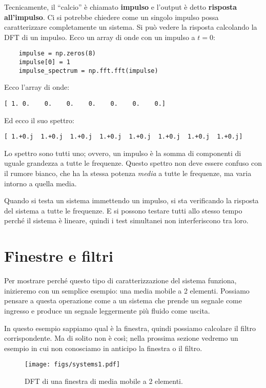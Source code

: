 \documentclass[12pt,a4paper]{book}
\begin{document}
Tecnicamente, il ``calcio'' è chiamato {\bf impulso} e l'output è detto {\bf risposta all'impulso}. Ci si potrebbe chiedere come un singolo impulso possa caratterizzare completamente un sistema. Si può vedere la risposta calcolando la DFT di un impulso. Ecco un array di onde con un impulso a $t=0$:

\begin{verbatim} 
    impulse = np.zeros(8)
    impulse[0] = 1
    impulse_spectrum = np.fft.fft(impulse)
 \end{verbatim} 

Ecco l'array di onde:

\begin{verbatim} 
[ 1. 0.    0.    0.    0.    0.    0.    0.]
 \end{verbatim} 

Ed ecco il suo spettro:

\begin{verbatim} 
[ 1.+0.j  1.+0.j  1.+0.j  1.+0.j  1.+0.j  1.+0.j  1.+0.j  1.+0.j]
 \end{verbatim} 

Lo spettro sono tutti uno; ovvero, un impulso è la somma di componenti di uguale grandezza a tutte le frequenze. Questo spettro non deve essere confuso con il rumore bianco, che ha la stessa potenza {\em media} a tutte le frequenze, ma varia intorno a quella media.

Quando si testa un sistema immettendo un impulso, si sta verificando la risposta del sistema a tutte le frequenze. E si possono testare tutti allo stesso tempo perché il sistema è lineare, quindi i test simultanei non interferiscono tra loro.

\section{Finestre e filtri} \label{winfilt} 

Per mostrare perché questo tipo di caratterizzazione del sistema funziona, inizieremo con un semplice esempio: una media mobile a 2 elementi. Possiamo pensare a questa operazione come a un sistema che prende un segnale come ingresso e produce un segnale leggermente più fluido come uscita.

In questo esempio sappiamo qual è la finestra, quindi possiamo calcolare il filtro corrispondente. Ma di solito non è così; nella prossima sezione vedremo un esempio in cui non conosciamo in anticipo la finestra o il filtro.

\begin{figure} 

\centerline{\texttt{[image: figs/systems1.pdf]}} \caption{DFT di una finestra di media mobile a 2 elementi.} \label{fig.systems1} \end{figure} 
\end{document}
